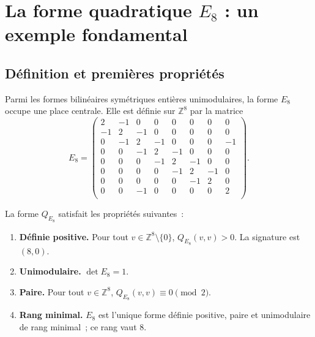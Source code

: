
\section{La forme quadratique \texorpdfstring{$E_8$}{E8} : un exemple fondamental}

\subsection{Définition et premières propriétés}

Parmi les formes bilinéaires symétriques entières unimodulaires, la forme $E_8$ occupe une
place centrale. Elle est définie sur $\mathbb{Z}^8$ par la matrice
\[
  E_8 =
  \begin{pmatrix}
     2 & -1 &  0 &  0 &  0 &  0 &  0 &  0 \\
    -1 &  2 & -1 &  0 &  0 &  0 &  0 &  0 \\
     0 & -1 &  2 & -1 &  0 &  0 &  0 & -1 \\
     0 &  0 & -1 &  2 & -1 &  0 &  0 &  0 \\
     0 &  0 &  0 & -1 &  2 & -1 &  0 &  0 \\
     0 &  0 &  0 &  0 & -1 &  2 & -1 &  0 \\
     0 &  0 &  0 &  0 &  0 & -1 &  2 &  0 \\
     0 &  0 & -1 &  0 &  0 &  0 &  0 &  2 \\
  \end{pmatrix}.
\]

\begin{proposition}\label{prop:e8_proprietes}
  La forme $Q_{E_8}$ satisfait les propriétés suivantes~:
  \begin{enumerate}
    \item \textbf{Définie positive.} Pour tout $v \in \mathbb{Z}^8 \setminus \{0\}$,
          $Q_{E_8}(v,v) > 0$. La signature est $(8,0)$.
    \item \textbf{Unimodulaire.} $\det E_8 = 1$.
    \item \textbf{Paire.} Pour tout $v \in \mathbb{Z}^8$, $Q_{E_8}(v,v) \equiv 0 \pmod{2}$.
    \item \textbf{Rang minimal.} $E_8$ est l'unique forme définie positive, paire et
          unimodulaire de rang minimal~; ce rang vaut $8$.
  \end{enumerate}
\end{proposition}

